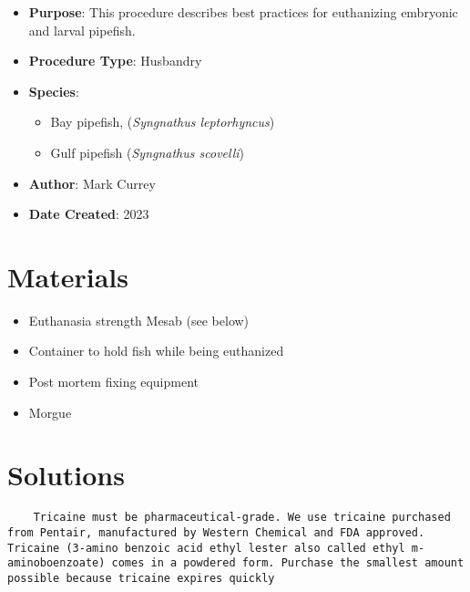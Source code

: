 \documentclass[
  letterpaper,
  DIV=11,
  numbers=noendperiod]{scrreprt}
\providecommand{\tightlist}{%
  \setlength{\itemsep}{0pt}\setlength{\parskip}{0pt}}\usepackage{longtable,booktabs,array}
\begin{document}
\begin{itemize}
\tightlist
\item
  \textbf{Purpose}: This procedure describes best practices for
  euthanizing embryonic and larval pipefish.
\item
  \textbf{Procedure Type}: Husbandry
\item
  \textbf{Species}:

  \begin{itemize}
  \tightlist
  \item
    Bay pipefish, (\emph{Syngnathus leptorhyncus})
  \item
    Gulf pipefish (\emph{Syngnathus scovelli})
  \end{itemize}
\item
  \textbf{Author}: Mark Currey
\item
  \textbf{Date Created}: 2023
\end{itemize}

\hypertarget{materials-17}{%
\section{Materials}\label{materials-17}}

\begin{itemize}
\tightlist
\item
  Euthanasia strength Mesab (see below)
\item
  Container to hold fish while being euthanized
\item
  Post mortem fixing equipment
\item
  Morgue
\end{itemize}

\hypertarget{solutions-14}{%
\section{Solutions}\label{solutions-14}}

\begin{tcolorbox}[enhanced jigsaw, bottomtitle=1mm, rightrule=.15mm, toptitle=1mm, opacitybacktitle=0.6, bottomrule=.15mm, titlerule=0mm, coltitle=black, leftrule=.75mm, arc=.35mm, colback=white, colframe=quarto-callout-warning-color-frame, left=2mm, colbacktitle=quarto-callout-warning-color!10!white, title=\textcolor{quarto-callout-warning-color}{\faExclamationTriangle}\hspace{0.5em}{NOTES}, toprule=.15mm, opacityback=0, breakable]

\begin{verbatim}
    Tricaine must be pharmaceutical-grade. We use tricaine purchased from Pentair, manufactured by Western Chemical and FDA approved. Tricaine (3-amino benzoic acid ethyl lester also called ethyl m-aminoboenzoate) comes in a powdered form. Purchase the smallest amount possible because tricaine expires quickly
\end{verbatim}

\end{tcolorbox}
\end{document}
